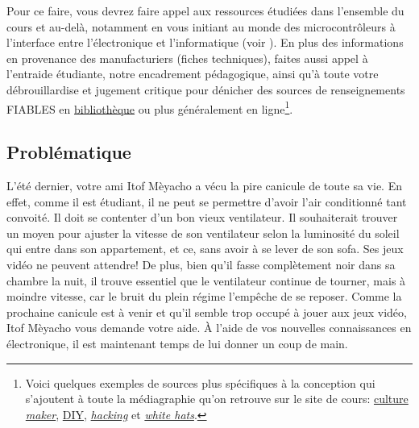 \documentclass[english,french,12pt]{article}
\begin{document}
Pour ce faire, vous devrez faire appel aux ressources étudiées dans l'ensemble du cours et au-delà, notamment en vous initiant au monde des microcontrôleurs à l'interface entre l'électronique et l'informatique (voir ). En plus des informations en provenance des manufacturiers (fiches techniques), faites aussi appel à l'entraide étudiante, notre encadrement pédagogique, ainsi qu'à toute votre débrouillardise et jugement critique pour dénicher des sources de renseignements FIABLES en \href{https://www5.bibl.ulaval.ca}{bibliothèque} ou plus généralement en ligne\footnote{Voici quelques exemples de sources plus spécifiques à la conception qui s'ajoutent à toute la médiagraphie qu'on retrouve sur le site de cours: \href{https://fr.wikipedia.org/wiki/Culture_maker}{culture \textit{maker}}, \href{https://www.reddit.com/r/diyelectronics/}{DIY}, \href{https://hackaday.com/about/}{\textit{hacking}} et \href{https://disboard.org/servers/tag/whitehat}{\textit{white hats}}.}.
\vspace{-1em}
\subsection*{Problématique}
L’été dernier, votre ami Itof Mèyacho a vécu la pire canicule de toute sa vie. En effet, comme il est étudiant, il ne peut se permettre d’avoir l’air conditionné tant convoité. Il doit se contenter d’un bon vieux ventilateur. Il souhaiterait trouver un moyen pour ajuster la vitesse de son ventilateur selon la luminosité du soleil qui entre dans son appartement, et ce, sans avoir à se lever de son sofa. Ses jeux vidéo ne peuvent attendre! De plus, bien qu’il fasse complètement noir dans sa chambre la nuit, il trouve essentiel que le ventilateur continue de tourner, mais à moindre vitesse, car le bruit du plein régime l’empêche de se reposer. Comme la prochaine canicule est à venir et qu’il semble trop occupé à jouer aux jeux vidéo, Itof Mèyacho vous demande votre aide. À l'aide de vos nouvelles connaissances en électronique, il est maintenant temps de lui donner un coup de main.
\end{document}
